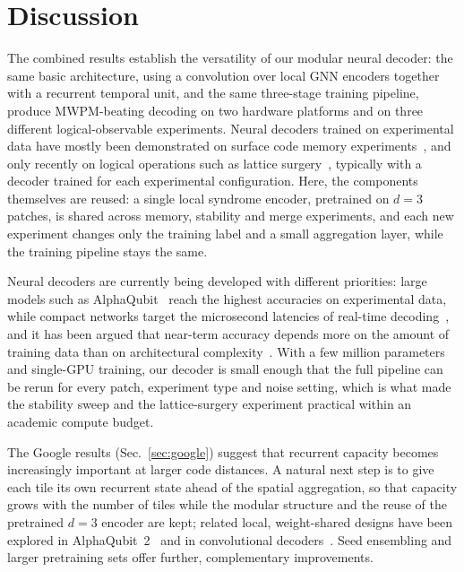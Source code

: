 \documentclass[aps,prxquantum,twocolumn,superscriptaddress,nofootinbib]{revtex4-2}
\begin{document}
\section{Discussion}
\label{sec:discussion}

The combined results establish the versatility of our modular neural decoder: the same basic architecture, using a convolution over local GNN encoders together with a recurrent temporal unit, and the same three-stage training pipeline, produce MWPM-beating decoding on two hardware platforms and on three different logical-observable experiments. Neural decoders trained on experimental data have mostly been demonstrated on surface code memory experiments~\cite{Varbanov_2025,bausch2024alphaqubit,senior2025alphaqubit2,zhang2026parallel}, and only recently on logical operations such as lattice surgery~\cite{lacroix2025color,lin2026logical}, typically with a decoder trained for each experimental configuration. Here, the components themselves are reused: a single local syndrome encoder, pretrained on $d=3$ patches, is shared across memory, stability and merge experiments, and each new experiment changes only the training label and a small aggregation layer, while the training pipeline stays the same.

Neural decoders are currently being developed with different priorities: large models such as AlphaQubit~\cite{bausch2024alphaqubit,senior2025alphaqubit2} reach the highest accuracies on experimental data, while compact networks target the microsecond latencies of real-time decoding~\cite{Overwater_2022,gicev2023scalable,yon2025memristive,cicero2026lowlatencygnnaccelerator,yang2026realtime}, and it has been argued that near-term accuracy depends more on the amount of training data than on architectural complexity~\cite{yan2026rethink}. With a few million parameters and single-GPU training, our decoder is small enough that the full pipeline can be rerun for every patch, experiment type and noise setting, which is what made the stability sweep and the lattice-surgery experiment practical within an academic compute budget.

The Google results (Sec.~\ref{sec:google}) suggest that recurrent capacity becomes increasingly important at larger code distances. A natural next step is to give each tile its own recurrent state ahead of the spatial aggregation, so that capacity grows with the number of tiles while the modular structure and the reuse of the pretrained $d=3$ encoder are kept; related local, weight-shared designs have been explored in AlphaQubit~2~\cite{senior2025alphaqubit2} and in convolutional decoders~\cite{gu2026scalable}. Seed ensembling and larger pretraining sets offer further, complementary improvements.
\end{document}
